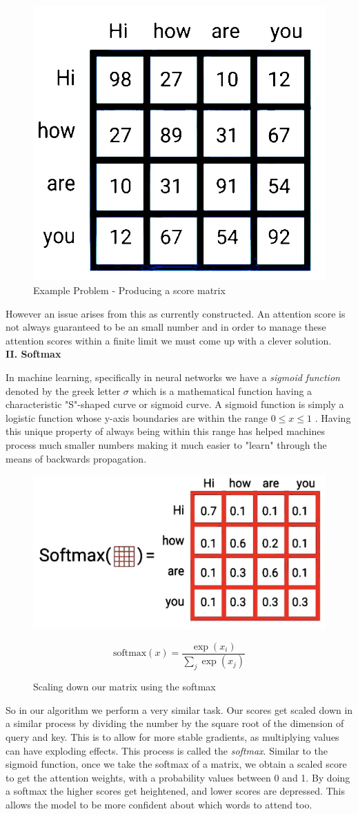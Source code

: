 \begin{figure}[H]
\centering
\includegraphics[width=.3\textwidth]{figures/t6.jpg}
\caption{Example Problem - Producing a score matrix}
\end{figure}

However an issue arises from this as currently constructed. An attention score is not always guaranteed to be an small number and in order to manage these attention scores within a finite limit we must come up with a clever solution. \\

\newpage
\noindent
\textbf{II. Softmax}

In machine learning, specifically in neural networks we have a \emph{sigmoid function} denoted by the greek letter $\sigma$ which is a mathematical function having a characteristic "S"-shaped curve or sigmoid curve. A sigmoid function is simply a logistic function whose y-axis boundaries are within the range $0\leq x \leq 1$ \cite{ten}. Having this unique property of always being within this range has helped machines process much smaller numbers making it much easier to "learn" through the means of backwards propagation.

\begin{figure}[H]
\centering
\includegraphics[width=.45\textwidth]{figures/t7.jpg}

\begin{equation}
\label{softmax}
\text{softmax}(x) = \frac{\exp({x_{i}})}{\sum_j \exp({x_{j}})}
\end{equation}

\caption{Scaling down our matrix using the softmax}
\end{figure}

So in our algorithm we perform a very similar task. Our scores get scaled down in a similar process by dividing the number by the square root of the dimension of query and key. This is to allow for more stable gradients, as multiplying values can have exploding effects. This process is called the \emph{softmax}. Similar to the sigmoid function, once we take the softmax of a matrix, we obtain a scaled score to get the attention weights, with a probability values between 0 and 1. By doing a softmax the higher scores get heightened, and lower scores are depressed. This allows the model to be more confident about which words to attend too. 

